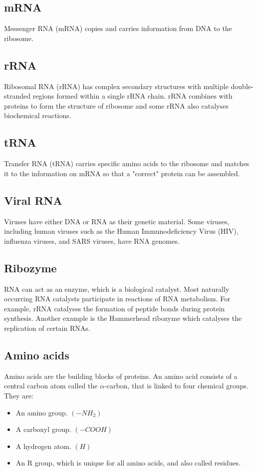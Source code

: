 \documentclass[11pt]{article}
\begin{document}
\subsection{mRNA}
\label{sec:org8121ffe}
Messenger RNA (mRNA) copies and carries information from DNA to the ribosome.
\subsection{rRNA}
\label{sec:orgfee7d0c}
Ribosomal RNA (rRNA) has complex secondary structures with multiple double-stranded regions formed within a single rRNA chain. rRNA combines with proteins to form the structure of ribosome and some rRNA also catalyses biochemical reactions.
\subsection{tRNA}
\label{sec:org39927cd}
Transfer RNA (tRNA) carries specific amino acids to the ribosome and matches it to the information on mRNA so that a "correct" protein can be assembled.
\subsection{Viral RNA}
\label{sec:org3431704}
Viruses have either DNA or RNA as their genetic material. Some viruses, including human viruses such as the Human Immunodeficiency Virus (HIV), influenza viruses, and SARS viruses, have RNA genomes.
\subsection{Ribozyme}
\label{sec:org951c254}
RNA can act as an enzyme, which is a biological catalyst. Most naturally occurring RNA catalysts participate in reactions of RNA metabolism. For example, rRNA catalyses the formation of peptide bonds during protein synthesis. Another example is the Hammerhead ribozyme which catalyses the replication of certain RNAs.

\newpage
\subsection{Amino acids}
\label{sec:org607de38}
Amino acids are the building blocks of proteins. An amino acid consists of a central carbon atom called the \(\alpha\)-carbon, that is linked to four chemical groups. They are:
\begin{itemize}
\item An amino group. \((-NH_2)\)
\item A carboxyl group. \((-COOH)\)
\item A hydrogen atom. \((H)\)
\item An R group, which is unique for all amino acids, and also called residues.
\end{itemize}
\end{document}
